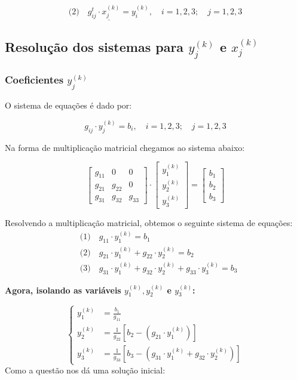 \documentclass[12pt,a4paper]{article}
\begin{document}
\[
\underline{\text{(2)} \quad g_{ij}^t \cdot x_j^{(k)} = y_i^{(k)}}, \quad i = 1, 2, 3; \quad j = 1, 2, 3
\]

\subsection{Resolução dos sistemas para \(y_j^{(k)}\) e \(x_j^{(k)}\)}

\subsubsection{Coeficientes \(y_j^{(k)}\)}

\noindent
O sistema de equações é dado por:

\[
g_{ij} \cdot y_j^{(k)} = b_i, \quad i = 1,2,3;\quad j = 1,2,3
\]

\noindent
Na forma de multiplicação matricial chegamos ao sistema abaixo:

\[
\begin{bmatrix}
g_{11} & 0      & 0 \\
g_{21} & g_{22} & 0 \\
g_{31} & g_{32} & g_{33}
\end{bmatrix}
\cdot
\begin{bmatrix}
y_1^{(k)} \\
y_2^{(k)} \\
y_3^{(k)}
\end{bmatrix}
=
\begin{bmatrix}
b_1 \\
b_2 \\
b_3
\end{bmatrix}
\]

\noindent
Resolvendo a multiplicação matricial, obtemos o seguinte sistema de equações:
\noindent
\begin{align*}
&\text{(1)} \quad g_{11} \cdot y_1^{(k)} = b_1 \\
&\text{(2)} \quad g_{21} \cdot y_1^{(k)} + g_{22} \cdot y_2^{(k)} = b_2 \\
&\text{(3)} \quad g_{31} \cdot y_1^{(k)} + g_{32} \cdot y_2^{(k)} + g_{33} \cdot y_3^{(k)} = b_3
\end{align*}

\noindent
\textbf{Agora, isolando as variáveis \( y_1^{(k)}, y_2^{(k)} \) e \( y_3^{(k)} \):}

\[
\left\{
\begin{aligned}
y_1^{(k)} &= \frac{b_1}{g_{11}} \\
y_2^{(k)} &= \frac{1}{g_{22}} \left[ b_2 - \left(g_{21} \cdot y_1^{(k)}\right) \right] \\
y_3^{(k)} &= \frac{1}{g_{33}} \left[ b_3 - \left(g_{31} \cdot y_1^{(k)} + g_{32} \cdot y_2^{(k)}\right) \right]
\end{aligned}
\right.
\]
\[\]
\[\]
\noindent
Como a questão nos dá uma solução inicial:
\end{document}

